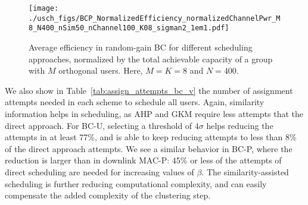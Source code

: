 \begin{figure}[tbp]
	\centering
	\texttt{[image: ./usch\_figs/BCP\_NormalizedEfficiency\_normalizedChannelPwr\_M8\_N400\_nSim50\_nChannel100\_K08\_sigman2\_1em1.pdf]}
	\caption{Average efficiency in random-gain BC  for different scheduling approaches, normalized by the total achievable capacity of a group with $M$ orthogonal users. Here, $M=K=8$ and $N=400$.}
	\label{fig:BCP_efficiency_M8_N400}
\end{figure}

We also show in Table~\ref{tab:assign_attempts_bc_v} the number of assignment attempts needed in each scheme to schedule all users.
Again, similarity information helps in scheduling, as AHP and GKM require less attempts that the direct approach. For BC-U, selecting a threshold of $4\sigma$ helps reducing the attempts in at least 77\%, and is able to keep reducing attempts to less than 8\% of the direct approach attempts. We see a similar behavior in BC-P, where the reduction is larger than in downlink MAC-P: 45\% or less of the attempts of direct scheduling are needed for increasing values of $\beta$. The similarity-assisted scheduling is further reducing computational complexity, and can easily compensate the added complexity of the clustering step.

